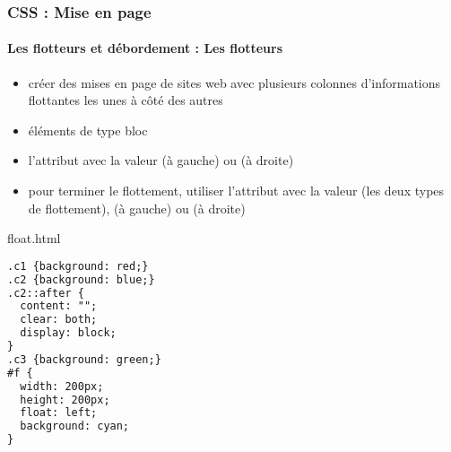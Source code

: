 \documentclass[xcolor=table]{beamer}
\begin{document}
\begin{frame}[fragile]
\frametitle{CSS : Mise en page}
\framesubtitle{Les flotteurs et débordement : Les flotteurs}

\begin{minipage}{0.60\textwidth}
	\begin{itemize}
		\item créer des mises en page de sites web avec plusieurs colonnes d'informations flottantes les unes à côté des autres
		\item éléments de type bloc
		\item l'attribut  avec la valeur  (à gauche) ou  (à droite)
		\item pour terminer le flottement, utiliser l'attribut  avec la valeur  (les deux types de flottement),  (à gauche) ou  (à droite)
	\end{itemize}
\end{minipage}
%
\begin{minipage}{0.38\textwidth}
	\begin{block}{float.html}
		\lstset{escapeinside=**}
		\scriptsize\bfseries
\begin{lstlisting}[language={html}]
.c1 {background: red;}
.c2 {background: blue;}
.c2::after {
  content: "";
  clear: both;
  display: block;
}
.c3 {background: green;}
#f {
  width: 200px;
  height: 200px;
  float: left;
  background: cyan;
}
\end{lstlisting}
	\end{block}
\end{minipage}
\end{frame}
\end{document}
